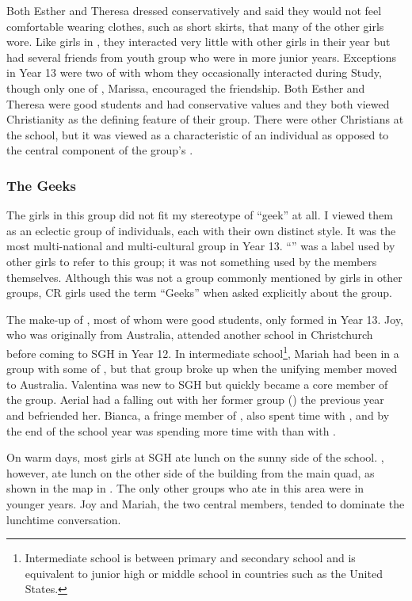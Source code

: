 Both Esther and Theresa dressed conservatively and said they would not feel comfortable wearing clothes, such as short skirts, that many of the other girls wore. Like girls in , they interacted very little with other girls in their year but had several friends from youth group who were in more junior years. Exceptions in Year 13 were two of  with whom they occasionally interacted during Study, though only one of , Marissa, encouraged the friendship. Both Esther and Theresa were good students and had conservative values and they both viewed Christianity as the defining feature of their group. There were other Christians at the school, but it was viewed as a characteristic of an individual as opposed to the central component of the group's .
 
\subsubsection{The Geeks}\label{geeks}

The girls in this group did not fit my stereotype of ``geek'' at all. I viewed them as an eclectic group of individuals, each with their own distinct style. It was the most multi-national and multi-cultural group in Year 13. ``'' was a label used by other girls to refer to this group; it was not something used by the members themselves. Although this was not a group commonly mentioned by girls in other groups, CR girls used the term ``Geeks'' when asked explicitly about the group. 

The make-up of , most of whom were good students, only formed in Year 13. Joy, who was originally from Australia, attended another school in Christchurch before coming to SGH in Year 12. In intermediate school\footnote{Intermediate school is between primary and secondary school and is equivalent to junior high or middle school in countries such as the United States.}, Mariah had been in a group with some of , but that group broke up when the unifying member moved to Australia. Valentina was new to SGH but quickly became a core member of the group. Aerial had a falling out with her former group () the previous year and  befriended her. Bianca, a fringe member of , also spent time with , and by the end of the school year was spending more time with  than with . 

On warm days, most girls at SGH ate lunch on the sunny side of the school. , however, ate lunch on the other side of the building from the main quad, as shown in the map in . The only other groups who ate in this area were in younger years. Joy and Mariah, the two central members, tended to dominate the lunchtime conversation. 

